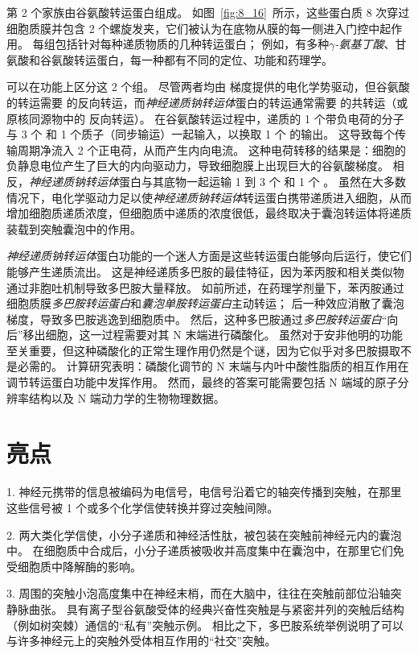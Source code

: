 第 2 个家族由谷氨酸转运蛋白组成。
如图~\ref{fig:8_16}~所示，这些蛋白质 8 次穿过细胞质膜并包含 2 个螺旋发夹，它们被认为在底物从膜的每一侧进入门控中起作用。
每组包括针对每种递质物质的几种转运蛋白；
例如，有多种\textit{$\gamma$-氨基丁酸}、甘氨酸和谷氨酸转运蛋白，每一种都有不同的定位、功能和药理学。


可以在功能上区分这 2 个组。
尽管两者均由  梯度提供的电化学势驱动，但谷氨酸的转运需要  的反向转运，而\textit{神经递质钠转运体}蛋白的转运通常需要  的共转运（或原核同源物中的  反向转运）。
在谷氨酸转运过程中，递质的 1 个带负电荷的分子与 3 个  和 1 个质子（同步输运）一起输入，以换取 1 个  的输出。
这导致每个传输周期净流入 2 个正电荷，从而产生内向电流。
这种电荷转移的结果是：细胞的负静息电位产生了巨大的内向驱动力，导致细胞膜上出现巨大的谷氨酸梯度。
相反，\textit{神经递质钠转运体}蛋白与其底物一起运输 1 到 3 个  和 1 个 。
虽然在大多数情况下，电化学驱动力足以使\textit{神经递质钠转运体}转运蛋白携带递质进入细胞，从而增加细胞质递质浓度，但细胞质中递质的浓度很低，最终取决于囊泡转运体将递质装载到突触囊泡中的作用。


\textit{神经递质钠转运体}蛋白功能的一个迷人方面是这些转运蛋白能够向后运行，使它们能够产生递质流出。
这是神经递质多巴胺的最佳特征，因为苯丙胺和相关类似物通过非胞吐机制导致多巴胺大量释放。
如前所述，在药理学剂量下，苯丙胺通过细胞质膜\textit{多巴胺转运蛋白}和\textit{囊泡单胺转运蛋白}主动转运；
后一种效应消散了囊泡  梯度，导致多巴胺逃逸到细胞质中。
然后，这种多巴胺通过\textit{多巴胺转运蛋白}“向后”移出细胞，这一过程需要对其 N 末端进行磷酸化。
虽然对于安非他明的功能至关重要，但这种磷酸化的正常生理作用仍然是个谜，因为它似乎对多巴胺摄取不是必需的。
计算研究表明：磷酸化调节的 N 末端与内叶中酸性脂质的相互作用在调节转运蛋白功能中发挥作用。
然而，最终的答案可能需要包括 N 端域的原子分辨率结构以及 N 端动力学的生物物理数据。



\section{亮点}

1. 神经元携带的信息被编码为电信号，电信号沿着它的轴突传播到突触，在那里这些信号被 1 个或多个化学信使转换并穿过突触间隙。


2. 两大类化学信使，小分子递质和神经活性肽，被包装在突触前神经元内的囊泡中。
在细胞质中合成后，小分子递质被吸收并高度集中在囊泡中，在那里它们免受细胞质中降解酶的影响。


3. 周围的突触小泡高度集中在神经末梢，而在大脑中，往往在突触前部位沿轴突静脉曲张。
具有离子型谷氨酸受体的经典兴奋性突触是与紧密并列的突触后结构（例如树突棘）通信的“私有”突触示例。
相比之下，多巴胺系统举例说明了可以与许多神经元上的突触外受体相互作用的“社交”突触。


